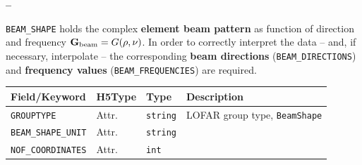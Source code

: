 \documentclass[a4paper,10pt,bibtotoc]{scrartcl}
\begin{document}
\begin{list}{\textbf{--}}{}
\begin{table}[ht]
    \caption{Attributes, groups and dataset attached to the noise curve
      calibration group.}
    \label{tab:noise curve group}
  \end{table}
  {\small
  }
\item \verb|BEAM_SHAPE| holds the complex \textbf{element beam pattern} as
  function of direction and frequency $\mathbf G_{\rm beam} = G (\vec \rho, \nu)$.
  In order to correctly interpret the data -- and, if necessary, interpolate --
  the corresponding \textbf{beam directions} (\verb|BEAM_DIRECTIONS|) and
  \textbf{frequency values} (\verb|BEAM_FREQUENCIES|) are required.
  \begin{table}[ht]
    \centering
    \begin{tabular}{|lllp{6cm}|}
      \hline
      \sc Field/Keyword & \sc H5Type & \sc Type & Description \\
      \hline \hline
      \verb|GROUPTYPE|        & Attr. & \verb|string| & LOFAR group type,
      \verb|BeamShape| \\
      \verb|BEAM_SHAPE_UNIT|  & Attr. & \verb|string|          &  \\
      \verb|NOF_COORDINATES|  & Attr. & \verb|int|             &

\end{tabular}
\end{table}
\end{list}
\end{document}
